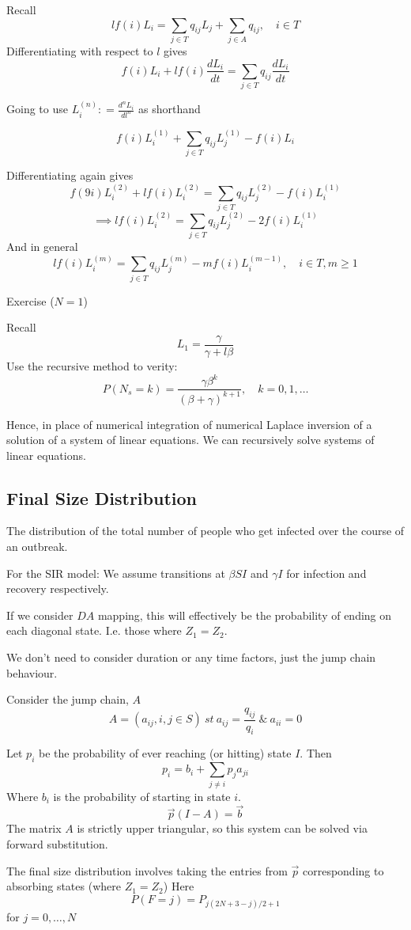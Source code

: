 \documentclass{/home/janmebows/Documents/LatexTemplates/myassignment}
\begin{document}
Recall
\[l f(i) L_i = \sum_{j\in T} q_{ij} L_j + \sum_{j\in A} q_{ij}, \quad i\in T\]
Differentiating with respect to $l$ gives
\[f(i) L_i + l f(i) \frac{dL_i}{dt} = \sum_{j\in T} q_{ij} \frac{dL_i}{dt}\]

Going to use $L_i^{(n)} : = \frac{d^n L_i}{dl^n}$ as shorthand

\[f(i) L_i^{(1)} + \sum_{j\in T} q_{ij} L_j^{(1)} - f(i) L_i\]

Differentiating again gives
\[f(9i) L_i^{(2)} + l f(i) L_i^{(2)} = \sum_{j\in T} q_{ij} L_j^{(2)} - f(i)L_i^{(1)}\]
\[\implies lf(i) L_i^{(2)} = \sum_{j\in T} q_{ij} L_j^{(2)} - 2f(i) L_i^{(1)}\]
And in general
\[l f(i) L_i^{(m)} = \sum_{j\in T} q_{ij} L_j^{(m)} - m f(i) L_i^{(m-1)}, \quad i \in T, m \geq 1\]


Exercise ($N=1$)

Recall
\[L_1 = \frac{\gamma}{\gamma + l \beta}\]
Use the recursive method to verity:
\[P(N_s = k) = \frac{\gamma \beta^k}{(\beta+\gamma)^{k+1}}, \quad k=0,1,\hdots\]


Hence, in place of numerical integration of numerical Laplace inversion of a solution of a system of linear equations. We can recursively solve systems of linear equations.


\subsection{Final Size Distribution}
The distribution of the total number of people who get infected over the course of an outbreak.

For the SIR model:
We assume transitions at $\beta SI$ and $\gamma I$ for infection and recovery respectively.

If we consider $DA$ mapping, this will effectively be the probability of ending on each diagonal state.
I.e. those where $Z_1 = Z_2$.

We don't need to consider duration or any time factors, just the jump chain behaviour.

Consider the jump chain, $A$
\[A = \left(a_{ij}, i,j \in S\right) \ st \ a_{ij} = \frac{q_{ij}}{q_{i}} \ \& \ a_{ii} = 0\]

Let $p_i$ be the probability of ever reaching (or hitting) state $I$. Then
\[p_i = b_i + \sum_{j\neq i} p_j a_{ji}\]
Where $b_i$ is the probability of starting in state $i$.
\[\vec p (I-A) = \vec b \]
The matrix $A$ is strictly upper triangular, so this system can be solved via forward substitution.

The final size distribution involves taking the entries from $\vec p$ corresponding to absorbing states (where $Z_1=Z_2$)
Here
\[P(F=j) = P_{j(2N+3-j)/2 +1}\]
for $j=0,\hdots,N$
\end{document}
